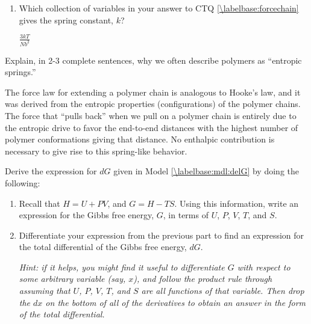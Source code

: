 \begin{activity}
\begin{ctqs}
\begin{enumerate}
			\item Which collection of variables in your answer to CTQ \ref{\labelbase:forcechain} gives the spring constant, $k$?
		
				\begin{solution}[0.75in]
					$\frac{3kT}{Nb^2}$
				\end{solution}
			
		\end{enumerate}
		
	\question Explain, in 2-3 complete sentences, why we often describe polymers as ``entropic springs.''
	
		\begin{solution}[2.5in]
			The force law for extending a polymer chain is analogous to Hooke's law, and it was derived from the entropic properties (configurations) of the polymer chains.  The force that ``pulls back'' when we pull on a polymer chain is entirely due to the entropic drive to favor the end-to-end distances with the highest number of polymer conformations giving that distance.  No enthalpic contribution is necessary to give rise to this spring-like behavior.
		\end{solution}
	
\end{ctqs}
	
	
\begin{exercises}
	\exercise \label{\labelbase:exc:dG} Derive the expression for $dG$ given in Model \ref{\labelbase:mdl:delG} by doing the following:
	
		\begin{enumerate}
			\item Recall that $H = U+ PV$, and $G=H-TS$.  Using this information, write an expression for the Gibbs free energy, $G$, in terms of $U$, $P$, $V$, $T$, and $S$.
			
				\begin{solution}\end{solution}
			
			\item Differentiate your expression from the previous part to find an expression for the total differential of the Gibbs free energy, $dG$.
			
				\emph{Hint: if it helps, you might find it useful to differentiate $G$ with respect to some arbitrary variable (say, $x$), and follow the product rule through assuming that $U$, $P$, $V$, $T$, and $S$ are all functions of that variable.  Then drop the $dx$ on the bottom of all of the derivatives to obtain an answer in the form of the total differential.}
			

\end{enumerate}
\end{exercises}
\end{activity}
